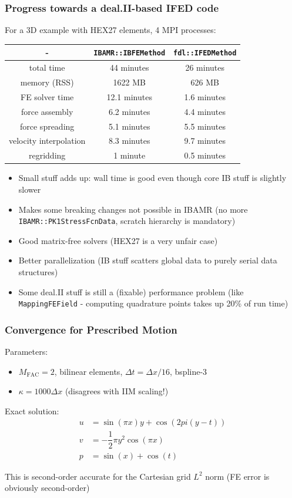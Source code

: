 \documentclass[8pt]{beamer}
\newcommand{\mfac}{M_\text{FAC}}
\begin{document}
\begin{frame}
    \frametitle{Progress towards a deal.II-based IFED code}
    For a 3D example with HEX27 elements, 4 MPI processes:
    \begin{center}
    \begin{tabular}{c c c}
      -          & \texttt{IBAMR::IBFEMethod} & \texttt{fdl::IFEDMethod} \\
      \hline
      total time             & 44 minutes   & 26 minutes \\
      memory (RSS)           & 1622 MB      & 626 MB \\
      FE solver time         & 12.1 minutes & 1.6 minutes \\
      force assembly         & 6.2 minutes  & 4.4 minutes \\
      force spreading        & 5.1 minutes  & 5.5 minutes \\
      velocity interpolation & 8.3 minutes  & 9.7 minutes \\
      regridding             & 1 minute     & 0.5 minutes \\
    \end{tabular}
    \end{center}
    \begin{itemize}
      \item Small stuff adds up: wall time is good even though core IB stuff is
        slightly slower
      \item Makes some breaking changes not possible in IBAMR (no more
        \texttt{IBAMR::PK1StressFcnData}, scratch hierarchy is mandatory)
      \item Good matrix-free solvers (HEX27 is a very unfair case)
      \item Better parallelization (IB stuff scatters global data to purely
        serial data structures)
      \item Some deal.II stuff is still a (fixable) performance problem (like
        \texttt{MappingFEField} - computing quadrature points takes up 20\% of
        run time)
    \end{itemize}
\end{frame}


\begin{frame}
    \frametitle{Convergence for Prescribed Motion}
    Parameters:
    \begin{itemize}
      \item $\mfac = 2$, bilinear elements, $\Delta t = \Delta x / 16$,
        bspline-3
      \item $\kappa = 1000 \Delta x$ (disagrees with IIM scaling!)
    \end{itemize}
    Exact solution:
    \begin{align}
      u &= \sin(\pi x) y + \cos(2 pi (y - t)) \\
      v &= -\dfrac{1}{2} \pi y^2 \cos(\pi x) \\
      p &= \sin(x) + \cos(t)
    \end{align}

    This is second-order accurate for the Cartesian grid $L^2$ norm (FE error is
    obviously second-order)
\end{frame}
\end{document}
